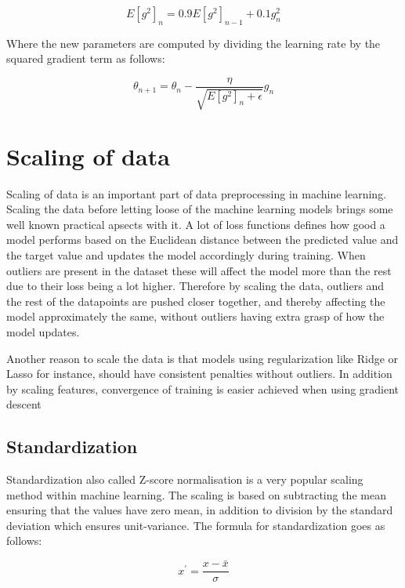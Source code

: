 \documentclass[../main.tex]{subfiles}
\begin{document}
\begin{equation*}
E\left[g^{2}\right]_{n}=0.9 E\left[g^{2}\right]_{n-1}+0.1 g_{n}^{2}
\end{equation*}

Where the new parameters are computed by dividing the learning rate by the squared gradient term as follows:

\begin{equation*}
\theta_{n+1}=\theta_{n}-\frac{\eta}{\sqrt{E\left[g^{2}\right]_{n}+\epsilon}} g_{n}
\end{equation*}

\section{Scaling of data}
Scaling of data is an important part of data preprocessing in machine learning. Scaling the data before letting loose of the machine learning models brings some well known practical apsects with it. A lot of loss functions defines how good a model performs based on the Euclidean distance between the predicted value and the target value and updates the model accordingly during training. When outliers are present in the dataset these will affect the model more than the rest due to their loss being a lot higher. Therefore by scaling the data, outliers and the rest of the datapoints are pushed closer together, and thereby affecting the model approximately the same, without outliers having extra grasp of how the model updates.

Another reason to scale the data is that models using regularization like Ridge or Lasso for instance, should have consistent penalties without outliers. In addition by scaling features, convergence of training is easier achieved when using gradient descent\cite{gd_conv_scale}

\subsection{Standardization}
Standardization also called Z-score normalisation is a very popular scaling method within machine learning. The scaling is based on subtracting the mean ensuring that the values have zero mean, in addition to division by the standard deviation which ensures unit-variance. The formula for standardization goes as follows:

\begin{equation*}
x^{\prime}=\frac{x-\bar{x}}{\sigma}
\end{equation*}
\end{document}
